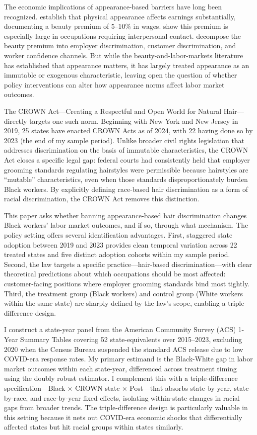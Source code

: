\documentclass[12pt]{article}
\begin{document}
The economic implications of appearance-based barriers have long been recognized. \citet{hamermesh1994} establish that physical appearance affects earnings substantially, documenting a beauty premium of 5--10\% in wages. \citet{biddle1998} show this premium is especially large in occupations requiring interpersonal contact. \citet{mobius2006} decompose the beauty premium into employer discrimination, customer discrimination, and worker confidence channels. But while the beauty-and-labor-markets literature has established that appearance matters, it has largely treated appearance as an immutable or exogenous characteristic, leaving open the question of whether policy interventions can alter how appearance norms affect labor market outcomes.

The CROWN Act---Creating a Respectful and Open World for Natural Hair---directly targets one such norm. Beginning with New York and New Jersey in 2019, 25 states have enacted CROWN Acts as of 2024, with 22 having done so by 2023 (the end of my sample period). Unlike broader civil rights legislation that addresses discrimination on the basis of immutable characteristics, the CROWN Act closes a specific legal gap: federal courts had consistently held that employer grooming standards regulating hairstyles were permissible because hairstyles are ``mutable'' characteristics, even when those standards disproportionately burden Black workers. By explicitly defining race-based hair discrimination as a form of racial discrimination, the CROWN Act removes this distinction.

This paper asks whether banning appearance-based hair discrimination changes Black workers' labor market outcomes, and if so, through what mechanism. The policy setting offers several identification advantages. First, staggered state adoption between 2019 and 2023 provides clean temporal variation across 22 treated states and five distinct adoption cohorts within my sample period. Second, the law targets a specific practice---hair-based discrimination---with clear theoretical predictions about which occupations should be most affected: customer-facing positions where employer grooming standards bind most tightly. Third, the treatment group (Black workers) and control group (White workers within the same state) are sharply defined by the law's scope, enabling a triple-difference design.

I construct a state-year panel from the American Community Survey (ACS) 1-Year Summary Tables covering 52 state-equivalents over 2015--2023, excluding 2020 when the Census Bureau suspended the standard ACS release due to low COVID-era response rates. My primary estimand is the Black-White gap in labor market outcomes within each state-year, differenced across treatment timing using the \citet{callaway2021} doubly robust estimator. I complement this with a triple-difference specification---Black $\times$ CROWN state $\times$ Post---that absorbs state-by-year, state-by-race, and race-by-year fixed effects, isolating within-state changes in racial gaps from broader trends. The triple-difference design is particularly valuable in this setting because it nets out COVID-era economic shocks that differentially affected states but hit racial groups within states similarly.
\end{document}
